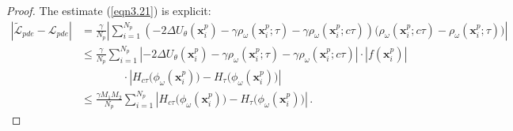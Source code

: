 \documentclass[final,hidelinks,onefignum,onetabnum]{siamart251216}
\begin{document}
\begin{proof}
The estimate (\ref{eqn3.21}) is explicit:
\begin{equation*}
\begin{aligned}
|\tilde{\mathcal{L}}_{pde}-\mathcal{L}_{pde}| 
&= \frac{\gamma}{N_p} \left| \sum_{i=1}^{N_p} \left(-2\Delta U_{\theta}(\mathbf{x}_i^p) - \gamma \rho_{\omega}(\mathbf{x}_i^p;\tau) - \gamma \rho_{\omega}(\mathbf{x}_i^p;c\tau)\right)  \big(\rho_{\omega}(\mathbf{x}_i^p;c\tau) - \rho_{\omega}(\mathbf{x}_i^p; \tau) \big) \right| \\
&\le \frac{\gamma}{N_p}  \sum_{i=1}^{N_p} \left|-2\Delta U_{\theta}(\mathbf{x}_i^p) - \gamma \rho_{\omega}(\mathbf{x}_i^p;\tau) - \gamma \rho_{\omega}(\mathbf{x}_i^p;c\tau)\right| \cdot | f(\mathbf{x}_i^p) | \\
&\hspace{45pt} \cdot \left| H_{c\tau}\big(\phi_\omega(\mathbf{x}_i^p)\big) - H_\tau\big(\phi_\omega(\mathbf{x}_i^p)\big) \right| \\
&\le \frac{\gamma M_1 M_2}{N_p} \sum_{i=1}^{N_p} \left| H_{c\tau}\big(\phi_\omega(\mathbf{x}_i^p)\big) - H_\tau\big(\phi_\omega(\mathbf{x}_i^p)\big) \right|\,.
\end{aligned}
\end{equation*}


\end{proof}
\end{document}
